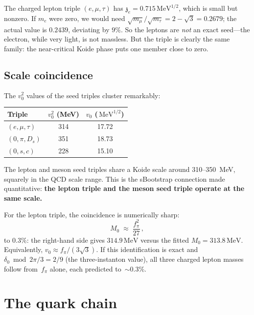 \documentclass[12pt,a4paper]{article}
\newcommand{\MeV}{\,\text{MeV}}
\newcommand{\fpi}{f_\pi}
\newcommand{\zch}{\mathfrak{z}}
\begin{document}
The charged lepton triple $(e, \mu, \tau)$ has $\zch_e = 0.715\MeV^{1/2}$,
which is small but nonzero. If $m_e$ were zero, we would need
$\sqrt{m_\mu}/\sqrt{m_\tau} = 2 - \sqrt{3} = 0.2679$; the actual value
is $0.2439$, deviating by $9\%$. So the leptons are \emph{not} an
exact seed---the electron, while very light, is not massless. But the
triple is clearly the same family: the near-critical Koide phase puts
one member close to zero.

\subsection{Scale coincidence}

The $v_0^2$ values of the seed triples cluster remarkably:

\begin{center}
\begin{tabular}{lcc}
\toprule
Triple & $v_0^2$ (MeV) & $v_0$ ($\MeV^{1/2}$) \\
\midrule
$(e, \mu, \tau)$ & 314 & 17.72 \\
$(0, \pi, D_s)$ & 351 & 18.73 \\
$(0, s, c)$ & 228 & 15.10 \\
\bottomrule
\end{tabular}
\end{center}

The lepton and meson seed triples share a Koide scale around
310--350~MeV, squarely in the QCD scale range. This is the
sBootstrap connection made quantitative: \textbf{the lepton triple
and the meson seed triple operate at the same scale.}

For the lepton triple, the coincidence is numerically sharp:
\begin{equation}
M_0 \;\approx\; \frac{\fpi^2}{27}\,,
\end{equation}
to $0.3\%$: the right-hand side gives $314.9\MeV$ versus
the fitted $M_0 = 313.8\MeV$.  Equivalently,
$v_0 \approx \fpi/(3\sqrt{3})$.  If this identification is exact
and $\delta_0 \bmod 2\pi/3 = 2/9$ (the three-instanton value),
all three charged lepton masses follow from~$\fpi$ alone,
each predicted to~${\sim}0.3\%$.

\section{The quark chain}
\end{document}
